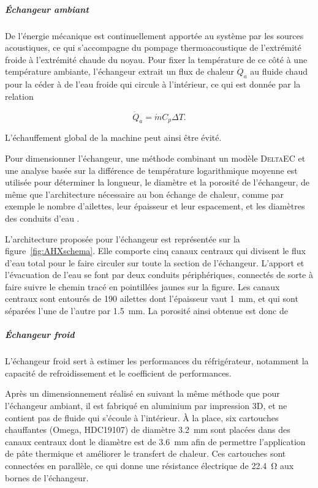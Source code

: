\subparagraph{\'Echangeur ambiant} 
De l'énergie mécanique est continuellement apportée au système par les sources acoustiques, ce qui s'accompagne du pompage thermoacoustique de l'extrémité froide à l'extrémité chaude du noyau. Pour fixer la température de ce côté à une température ambiante, l'échangeur extrait un flux de chaleur $\dot Q_a$ au fluide chaud pour la céder à de l'eau froide qui circule à l'intérieur, ce qui est donnée par la relation 

\begin{equation}
	\dot Q_a = \dot m C_p \Delta T.
	\label{eq:Qa_Definition}
\end{equation}

L'échauffement global de la machine peut ainsi être évité.

Pour dimensionner l'échangeur, une méthode combinant un modèle \textsc{DeltaEC} et une analyse basée sur la différence de température logarithmique moyenne est utilisée pour déterminer la longueur, le diamètre et la porosité de l'échangeur, de même que l'architecture nécessaire au bon échange de chaleur, comme par exemple le nombre d'ailettes, leur épaisseur et leur espacement, et les diamètres des conduits d'eau \cite{ramadan_design_2021}.

L'architecture proposée pour l'échangeur est représentée sur la figure~\ref{fig:AHXschema}. Elle comporte cinq canaux centraux qui divisent le flux d'eau total pour le faire circuler sur toute la section de l'échangeur. L'apport et l'évacuation de l'eau se font par deux conduits périphériques, connectés de sorte à faire suivre le chemin tracé en pointillées jaunes sur la figure. Les canaux centraux sont entourés de \num{190} ailettes dont l'épaisseur vaut \qty{1}{\milli\meter}, et qui sont séparées l'une de l'autre par \qty{1.5}{\milli\metre}. La porosité ainsi obtenue est donc de 


\subparagraph{\'Echangeur froid}
L'échangeur froid sert à estimer les performances du réfrigérateur, notamment la capacité de refroidissement et le coefficient de performances. 

Après un dimensionnement réalisé en suivant la même méthode que pour l'échangeur ambiant, il est fabriqué en aluminium par impression 3D, et ne contient pas de fluide qui s'écoule à l'intérieur. À la place, six cartouches chauffantes (Omega, HDC19107) de diamètre \qty{3.2}{\milli\meter} sont placées dans des canaux centraux dont le diamètre est de \qty{3.6}{\milli\meter} afin de permettre l'application de pâte thermique et améliorer le transfert de chaleur. Ces cartouches sont connectées en parallèle, ce qui donne une résistance électrique de \qty{22.4}{\ohm} aux bornes de l'échangeur. 

